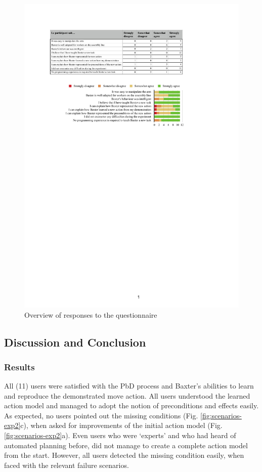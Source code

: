   \begin{figure}[ht]
   \centering
    \includegraphics[scale=1]{figures/eEvaluation}
    \caption{Overview of responses to the questionnaire}
    \label{fig:eEvaluation}
\end{figure}

\subsection{Discussion and Conclusion}
\subsubsection{Results}
All (11) users were satisfied with the PbD process and Baxter's abilities to learn and reproduce the demonstrated move action. All users understood the learned action model and managed to adopt the notion of preconditions and effects easily. As expected, no users pointed out the missing conditions (Fig. \ref{fig:scenarios-exp2}c), when asked for improvements of the initial action model (Fig. \ref{fig:scenarios-exp2}a).
Even users who were `experts' and who had heard of automated planning before, did not manage to create a complete action model from the start. However, all users detected the missing condition easily, when faced with the relevant failure scenarios.

